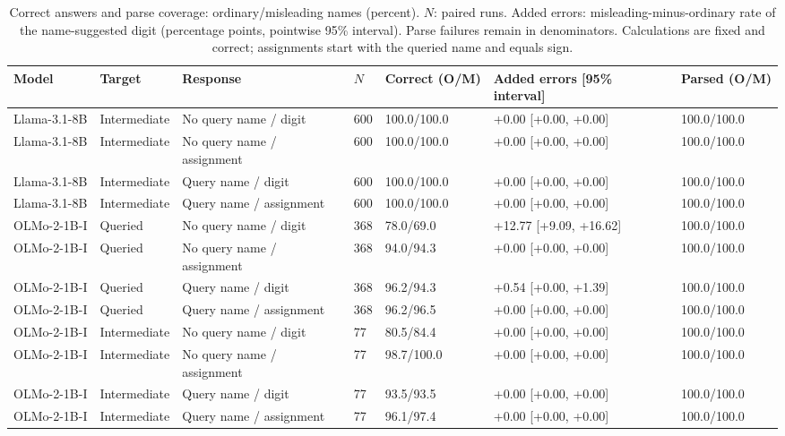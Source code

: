 \begin{table}[t]
\centering\small\setlength{\tabcolsep}{3pt}
\begin{tabular}{@{}p{}p{}p{}p{}p{}p{}p{}@{}}
\toprule
Model & Target & Response & $N$ & Correct (O/M) & Added errors [95\% interval] & Parsed (O/M) \\
\midrule
Llama-3.1-8B & Intermediate & No query name / digit & 600 & 100.0/100.0 & +0.00 [+0.00, +0.00] & 100.0/100.0 \\
Llama-3.1-8B & Intermediate & No query name / assignment & 600 & 100.0/100.0 & +0.00 [+0.00, +0.00] & 100.0/100.0 \\
Llama-3.1-8B & Intermediate & Query name / digit & 600 & 100.0/100.0 & +0.00 [+0.00, +0.00] & 100.0/100.0 \\
Llama-3.1-8B & Intermediate & Query name / assignment & 600 & 100.0/100.0 & +0.00 [+0.00, +0.00] & 100.0/100.0 \\
OLMo-2-1B-I & Queried & No query name / digit & 368 & 78.0/69.0 & +12.77 [+9.09, +16.62] & 100.0/100.0 \\
OLMo-2-1B-I & Queried & No query name / assignment & 368 & 94.0/94.3 & +0.00 [+0.00, +0.00] & 100.0/100.0 \\
OLMo-2-1B-I & Queried & Query name / digit & 368 & 96.2/94.3 & +0.54 [+0.00, +1.39] & 100.0/100.0 \\
OLMo-2-1B-I & Queried & Query name / assignment & 368 & 96.2/96.5 & +0.00 [+0.00, +0.00] & 100.0/100.0 \\
OLMo-2-1B-I & Intermediate & No query name / digit & 77 & 80.5/84.4 & +0.00 [+0.00, +0.00] & 100.0/100.0 \\
OLMo-2-1B-I & Intermediate & No query name / assignment & 77 & 98.7/100.0 & +0.00 [+0.00, +0.00] & 100.0/100.0 \\
OLMo-2-1B-I & Intermediate & Query name / digit & 77 & 93.5/93.5 & +0.00 [+0.00, +0.00] & 100.0/100.0 \\
OLMo-2-1B-I & Intermediate & Query name / assignment & 77 & 96.1/97.4 & +0.00 [+0.00, +0.00] & 100.0/100.0 \\
\bottomrule
\end{tabular}
\caption{Correct answers and parse coverage: ordinary/misleading names (percent). $N$: paired runs. Added errors: misleading-minus-ordinary rate of the name-suggested digit (percentage points, pointwise 95\% interval). Parse failures remain in denominators. Calculations are fixed and correct; assignments start with the queried name and equals sign.}
\label{tab:r7-final_query-cells-2}
\end{table}
